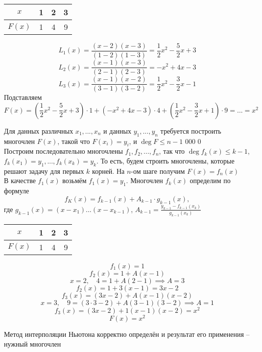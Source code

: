 \begin{eg}
    \begin{tabular}{c || c | c | c}
    	$x$ & 1 & 2 & 3 \\
        \hline
        $F(x)$ & 1 & 4 & 9
    \end{tabular}
    $$ L_1(x) = \frac{(x-2)(x-3)}{(1-2)(1-3)} = \frac12 x^2 - \frac52 x + 3 $$
    $$ L_2(x) = \frac{(x-1)(x-3)}{(2-1)(2-3)} = - x^2 + 4x - 3 $$
    $$ L_3(x) = \frac{(x-1)(x-2)}{(3-1)(3-2)} = \frac12 x^2 - \frac32 x - 1 $$
    Подставляем
    $$ F(x) = (\frac12 x^2 - \frac52x + 3) \cdot 1 + (-x^2 + 4x - 3) \cdot 4 + (\frac12 x^2 - \frac32x + 1) \cdot 9 = ... = x^2 $$
\end{eg}

\begin{algorithm}
	Для данных различных $x_1,...,x_n$ и данных $y_1,...,y_n$ требуется построить многочлен $F(x)$, такой что $F(x_i) = y_i$, и $ \deg F \le n - 1$
000 0   \ \\
    Построим последовательно многочлены $f_1, f_2, ..., f_n$, так что $ \deg f_k(x) \le k - 1$, $f_k(x_1) = y_1, ..., f_k(x_k) = y_k $. То есть, будем строить многочлены, которые решают задачу для первых $k$ корней. На $n$-ом шаге получим $F(x) = f_n(x) $
    \ \\
    В качестве $f_1(x)$ возьмём $ f_1(x) = y_1$. Многочлен $f_k(x)$ определим по формуле
    $$ f_K(x) = f_{k-1}(x) + A_{k-1} \cdot g_{k-1}(x), $$
    где $g_{k-1}(x) = (x-x_1)...(x-x_{k-1}) $, $ A_{k-1} = \frac{y_{k-1}-f_{k-1}(x_k)}{g_{k-1}(x_k)} $
\end{algorithm}

\begin{eg}
	\begin{tabular}{c || c | c | c}
    	$x$ & 1 & 2 & 3 \\
        \hline
        $F(x)$ & 1 & 4 & 9
    \end{tabular}
    $$ f_1(x) = 1 $$
    $$ f_2(x) = 1 + A(x-1) $$
    $$ x = 2, \quad 4 = 1 + A(2-1) \implies A = 3 $$
    $$ f_2(x) = 1 + 3(x-1) = 3x - 2$$
    $$ f_3(x) = (3x - 2) + A(x-1)(x-2) $$
    $$ x = 3, \quad 9 = (3\cdot3 - 2) + A(3 - 1)(3 - 2) \implies A = 1 $$
    $$ f_3(x) = (3x - 2) + 1 (x-1)(x-2) = x^2 $$
    $$ F(x) = x^2 $$
\end{eg}

\begin{theorem}
	Метод интерполяции Ньютона корректно определён и результат его применения -- нужный многочлен
\end{theorem}

